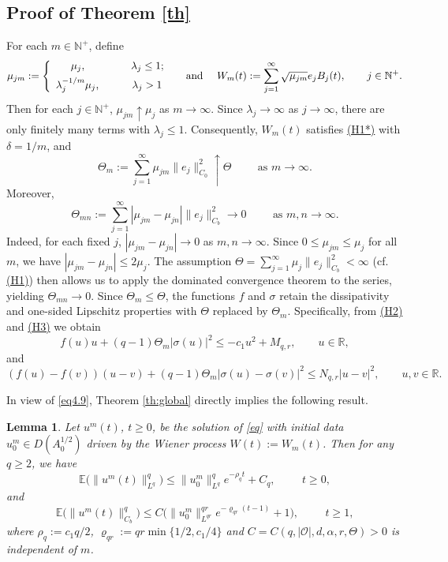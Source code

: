 \documentclass[10pt]{article}
\numberwithin{figure}{section}
\numberwithin{equation}{section}
\newtheorem{lemma}[theorem]{Lemma}
\newcommand{\0}{{\theta}}
\def\ba{\begin{array}}
\def\ea{\end{array}}
\def\lam{\lambda}
\def\Hs{\hspace{1cm}}\def\hs{\hspace{0.5cm}}
\def\[{\left[}\def\]{\right]}
\begin{document}
\subsection{Proof of Theorem \ref{th}}
For each $m\in\mathbb{N}^+$, define $$\mu_{jm}:=\left\{\ba{lll}\hs\mu_j,\Hs\hs \lam_j\le1;\\[1ex]\lam_j^{-1/m}\mu_j,\,\hs\hs\lam_j>1 \ea\right.\quad\hbox{ and }\quad W_m(t):=\sum_{j=1}^{\infty} \sqrt{\mu_{jm}} e_j B_j(t),\qquad j\in\mathbb{N}^+.$$
Then for each $j\in\mathbb{N}^+$, $\mu_{jm}\uparrow \mu_j$ as $m\to\infty$. 
Since $\lambda_j \to \infty$ as $j\to\infty$, there are only finitely many terms with $\lambda_j \le 1$. 
Consequently, $W_m(t)$ satisfies \hyperref[H1*]{(H1*)} with $\delta = 1/m$, 
and$$
\Theta_m := \sum_{j=1}^\infty \mu_{jm} \|e_j\|_{C_0}^2 \uparrow \Theta \Hs \text{as } m\to\infty.
$$
Moreover,
$$
\Theta_{mn}:=\sum_{j=1}^{\infty} |\mu_{jm}-\mu_{jn}| \| e_j \|_{C_b}^2 \to 0 \Hs \text{as } m,n\to\infty.
$$
Indeed, for each fixed $j$, $|\mu_{jm}-\mu_{jn}| \to 0$ as $m,n\to\infty$. 
Since $0 \le \mu_{jm} \le \mu_j$ for all $m$, we have $|\mu_{jm}-\mu_{jn}| \le 2\mu_j$. 
The assumption $\Theta = \sum_{j=1}^\infty \mu_j \|e_j\|_{C_b}^2 < \infty$ (cf. \hyperref[H1]{(H1)}) then allows us to apply the dominated convergence theorem to the series, yielding $\Theta_{mn} \to 0$.
\vs
Since $\Theta_m \le \Theta$, the functions $f$ and $\sigma$ retain the dissipativity and one-sided Lipschitz properties with $\Theta$ replaced by $\Theta_m$. Specifically, from \hyperref[H2]{(H2)} and \hyperref[H3]{(H3)} we obtain
\begin{equation}\label{eq4.9}
f(u)u + (q-1)\Theta_m |\sigma(u)|^2 \le -c_1 u^2 + M_{q,r},\qquad u\in\mathbb{R},
\end{equation}
and
\begin{equation}\label{eq4.22}
(f(u)-f(v))(u-v) + (q-1)\Theta_m|\sigma(u)-\sigma(v)|^2 \le N_{q,r} |u-v|^2 ,\qquad u,v \in \mathbb{R}.
\end{equation}

In view of \eqref{eq4.9}, Theorem \ref{th:global} directly implies the following result.
\begin{lemma}\label{le4.6}
Let $u^m(t)$, $t\ge0$, be the solution of \eqref{eq} with initial data  
$u_0^m \in D(A_0^{1/2})$ driven by the Wiener process $W(t):=W_m(t)$. Then for any $q\ge2$, we have
\begin{equation}\label{eq3.17'}
\mathbb{E}\big(\| u^m(t) \|_{L^q}^q\big) \le \| u_0^m \|_{L^q}^q e^{-\rho_q t} 
                                + C_q, \Hs t \ge 0,
\end{equation}
and
\begin{equation}\label{eq4.11}
\mathbb{E}\big(\| u^m(t) \|_{C_b}^q\big) \le C\big(\| u_0^m \|_{L^{qr}}^{qr} e^{-\varrho_{qr}(t-1)} + 1 \big), \Hs t \ge 1,
\end{equation}
where $\rho_q:=c_1q/2$, $\varrho_{qr}:=qr\min\{1/2,c_1/4\}$ and $C = C(q,|\mathcal{O}|,d,\alpha,r,\Theta) > 0$ is independent of $m$.
\end{lemma}
\end{document}
